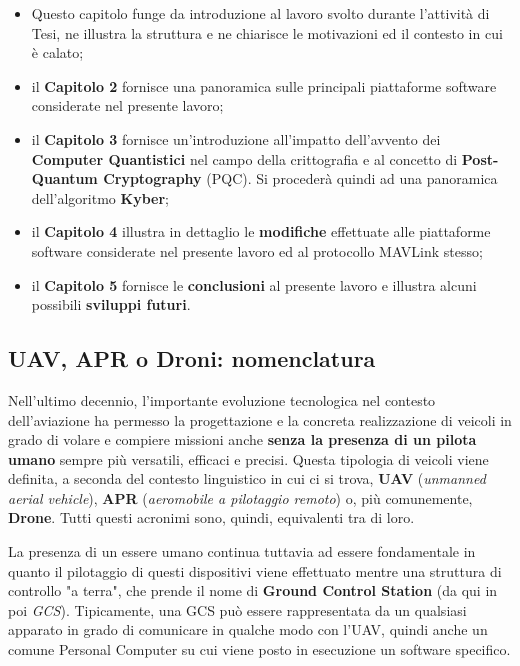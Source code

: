 \documentclass[a4paper, 12pt, oneside]{article}
\begin{document}
\begin{itemize}
    \item Questo capitolo funge da introduzione al lavoro svolto durante l'attività di Tesi, ne illustra la struttura e ne chiarisce le motivazioni ed il contesto in cui è calato;
    \item il \textbf{Capitolo 2} fornisce una panoramica sulle principali piattaforme software considerate nel presente lavoro;
    \item il \textbf{Capitolo 3} fornisce un'introduzione all'impatto dell'avvento dei \textbf{Computer Quantistici} nel campo della crittografia e al concetto di \textbf{Post-Quantum Cryptography} (PQC). Si procederà quindi ad una panoramica dell'algoritmo \textbf{Kyber};
    \item il \textbf{Capitolo 4} illustra in dettaglio le \textbf{modifiche} effettuate alle piattaforme software considerate nel presente lavoro ed al protocollo MAVLink stesso;
    \item il \textbf{Capitolo 5} fornisce le \textbf{conclusioni} al presente lavoro e illustra alcuni possibili \textbf{sviluppi futuri}.
\end{itemize}

\newpage


\subsection{UAV, APR o Droni: nomenclatura}
Nell'ultimo decennio, l'importante evoluzione tecnologica nel contesto dell'aviazione ha permesso la progettazione e la concreta realizzazione di veicoli in grado di volare e compiere missioni anche \textbf{senza la presenza di un pilota umano} sempre più versatili, efficaci e precisi. Questa tipologia di veicoli viene definita, a seconda del contesto linguistico in cui ci si trova, \textbf{UAV} (\textit{unmanned aerial vehicle}), \textbf{APR} (\textit{aeromobile a pilotaggio remoto}) o, più comunemente, \textbf{Drone}. Tutti questi acronimi sono, quindi, equivalenti tra di loro. 

La presenza di un essere umano continua tuttavia ad essere fondamentale in quanto il pilotaggio di questi dispositivi viene effettuato mentre una struttura di controllo "a terra", che prende il nome di \textbf{Ground Control Station} (da qui in poi \textit{GCS}). Tipicamente, una GCS può essere rappresentata da un qualsiasi apparato in grado di comunicare in qualche modo con l'UAV, quindi anche un comune Personal Computer su cui viene posto in esecuzione un software specifico.
\end{document}
